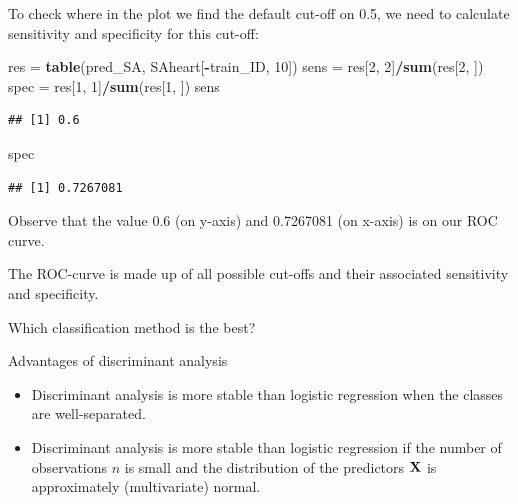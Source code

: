 \documentclass[10pt,ignorenonframetext,]{beamer}
\newenvironment{Shaded}{\begin{snugshade}}{\end{snugshade}}
\newcommand{\KeywordTok}[1]{\textcolor[rgb]{0.13,0.29,0.53}{\textbf{#1}}}
\newcommand{\DecValTok}[1]{\textcolor[rgb]{0.00,0.00,0.81}{#1}}
\newcommand{\StringTok}[1]{\textcolor[rgb]{0.31,0.60,0.02}{#1}}
\newcommand{\OperatorTok}[1]{\textcolor[rgb]{0.81,0.36,0.00}{\textbf{#1}}}
\newcommand{\NormalTok}[1]{#1}
\providecommand{\tightlist}{%
  \setlength{\itemsep}{0pt}\setlength{\parskip}{0pt}}
\begin{document}
\begin{frame}[fragile]

To check where in the plot we find the default cut-off on 0.5, we need
to calculate sensitivity and specificity for this cut-off:

\begin{Shaded}
\begin{Highlighting}[]
\NormalTok{res =}\StringTok{ }\KeywordTok{table}\NormalTok{(pred_SA, SAheart[}\OperatorTok{-}\NormalTok{train_ID, }\DecValTok{10}\NormalTok{])}
\NormalTok{sens =}\StringTok{ }\NormalTok{res[}\DecValTok{2}\NormalTok{, }\DecValTok{2}\NormalTok{]}\OperatorTok{/}\KeywordTok{sum}\NormalTok{(res[}\DecValTok{2}\NormalTok{, ])}
\NormalTok{spec =}\StringTok{ }\NormalTok{res[}\DecValTok{1}\NormalTok{, }\DecValTok{1}\NormalTok{]}\OperatorTok{/}\KeywordTok{sum}\NormalTok{(res[}\DecValTok{1}\NormalTok{, ])}
\NormalTok{sens}
\end{Highlighting}
\end{Shaded}

\begin{verbatim}
## [1] 0.6
\end{verbatim}

\begin{Shaded}
\begin{Highlighting}[]
\NormalTok{spec}
\end{Highlighting}
\end{Shaded}

\begin{verbatim}
## [1] 0.7267081
\end{verbatim}

Observe that the value 0.6 (on y-axis) and 0.7267081 (on x-axis) is on
our ROC curve.

The ROC-curve is made up of all possible cut-offs and their associated
sensitivity and specificity.

\end{frame}

\begin{frame}{Which classification method is the best?}

\begin{block}{Advantages of discriminant analysis}

\begin{itemize}
\tightlist
\item
  Discriminant analysis is more stable than logistic regression when the
  classes are well-separated.
\item
  Discriminant analysis is more stable than logistic regression if the
  number of observations \(n\) is small and the distribution of the
  predictors \({\bf X}\) is approximately (multivariate) normal.
\end{itemize}

\end{block}

\end{frame}
\end{document}

